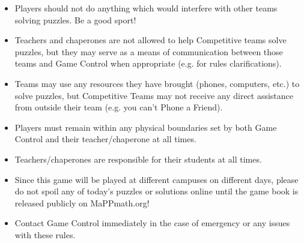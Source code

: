 \begin{itemize}
\item Players should not do anything which
would interfere with other teams solving puzzles. Be a good sport!
\item Teachers and chaperones are not allowed to help Competitive teams solve
puzzles, but they may serve as a means of communication between those teams and
Game Control when appropriate (e.g. for rules clarifications).
\item Teams may use any resources they have brought (phones, computers, etc.)
to solve puzzles, but Competitive Teams may not receive any direct
assistance from outside their team (e.g. you can't Phone a Friend).
\item Players must remain within any physical boundaries set by both
Game Control and their teacher/chaperone at all times.
\item Teachers/chaperones are responsible for their students at
all times.
\item Since this game will be played at different campuses on different
days, please do not spoil any of today's puzzles or solutions online until
the game book is released publicly on MaPPmath.org!
\item Contact Game Control immediately in the case of emergency
or any issues with these rules.
\end{itemize}

